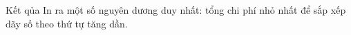 Kết qủa
In ra một số nguyên dương duy nhất: tổng chi phí nhỏ nhất để sắp xếp dãy số theo thứ tự tăng dần.